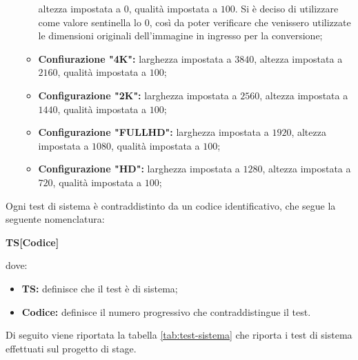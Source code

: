 \begin{itemize}
\begin{itemize}
                    altezza impostata a $0$, qualità impostata a $100$. Si è deciso di
                    utilizzare come valore sentinella lo $0$, così da poter verificare che
                    venissero utilizzate le dimensioni originali dell'immagine in ingresso
                    per la conversione;
              \item \textbf{Confiurazione "4K":} larghezza impostata a $3840$, altezza
                    impostata a $2160$, qualità impostata a $100$;
              \item \textbf{Configurazione "2K":} larghezza impostata a $2560$, altezza
                    impostata a $1440$, qualità impostata a $100$;
              \item \textbf{Configurazione "FULLHD":} larghezza impostata a $1920$,
                    altezza impostata a $1080$, qualità impostata a $100$;
              \item \textbf{Configurazione "HD":} larghezza impostata a $1280$, altezza
                    impostata a $720$, qualità impostata a $100$;
          \end{itemize}
\end{itemize}

Ogni test di sistema è contraddistinto da un codice identificativo, che segue la
seguente nomenclatura: \\
\begin{center}
    \textbf{TS[Codice]}
\end{center}
dove:
\begin{itemize}
    \item \textbf{TS:} definisce che il test è di sistema;
    \item \textbf{Codice:} definisce il numero progressivo che contraddistingue il test.
\end{itemize}

Di seguito viene riportata la tabella \ref{tab:test-sistema} che riporta i test
di sistema effettuati sul progetto di stage.

